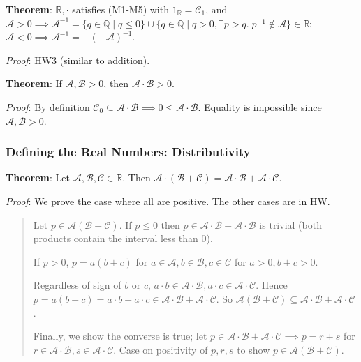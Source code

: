 \documentclass[11pt]{article}
\begin{document}
\textbf{Theorem}: $\mathbb{R}, \cdot$ satisfies (M1-M5) with $1_\mathbb{R} = \mathcal{C}_1$, and\\
$\mathcal{A} > 0 \implies \mathcal{A}^{-1} = \{q \in \mathbb{Q} \mid q \leq 0\} \cup \{q \in \mathbb{Q} \mid q > 0, \exists p > q.\; p^{-1} \notin \mathcal{A}\} \in \mathbb{R}$;\\
$\mathcal{A} < 0 \implies \mathcal{A}^{-1} = -(-\mathcal{A})^{-1}$.

\emph{Proof}: HW3 (similar to addition).

\textbf{Theorem}: If $\mathcal{A}, \mathcal{B} > 0$, then $\mathcal{A} \cdot \mathcal{B} > 0$.

\emph{Proof}: By definition $\mathcal{C}_0 \subseteq \mathcal{A} \cdot \mathcal{B} \implies 0 \leq \mathcal{A} \cdot \mathcal{B}$. Equality is impossible since $\mathcal{A}, \mathcal{B} > 0$.

\subsubsection{Defining the Real Numbers: Distributivity}

\textbf{Theorem}: Let $\mathcal{A}, \mathcal{B}, \mathcal{C} \in \mathbb{R}$. Then $\mathcal{A} \cdot (\mathcal{B} + \mathcal{C}) = \mathcal{A} \cdot \mathcal{B} + \mathcal{A} \cdot \mathcal{C}$.

\emph{Proof}: We prove the case where all are positive. The other cases are in HW.
\begin{quote}\vspace{-0.3cm}
Let $p \in \mathcal{A}(\mathcal{B} + \mathcal{C})$. If $p \leq 0$ then $p \in \mathcal{A} \cdot \mathcal{B} + \mathcal{A} \cdot \mathcal{B}$ is trivial (both products contain the interval less than 0).

If $p > 0$, $p = a(b+c)$ for $a \in \mathcal{A}, b \in \mathcal{B}, c \in \mathcal{C}$ for $a > 0, b + c > 0$.

Regardless of sign of $b$ or $c$, $a \cdot b \in \mathcal{A} \cdot \mathcal{B}, a \cdot c \in \mathcal{A} \cdot \mathcal{C}$. Hence $p = a(b+c) = a \cdot b + a \cdot c \in \mathcal{A} \cdot \mathcal{B} + \mathcal{A} \cdot \mathcal{C}$. So $\mathcal{A}(\mathcal{B} + \mathcal{C}) \subseteq \mathcal{A} \cdot \mathcal{B} + \mathcal{A} \cdot \mathcal{C}$.

Finally, we show the converse is true; let $p \in \mathcal{A} \cdot \mathcal{B} + \mathcal{A} \cdot \mathcal{C} \implies p = r+s$ for $r \in \mathcal{A} \cdot \mathcal{B}, s \in \mathcal{A} \cdot \mathcal{C}$. Case on positivity of $p,r,s$ to show $p \in \mathcal{A}(\mathcal{B} + \mathcal{C})$.
\end{quote}
\end{document}
